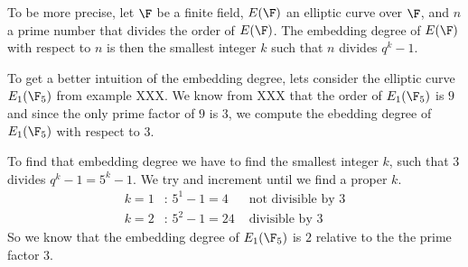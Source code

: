 To be more precise, let $\F$ be a finite field, $E(\F)$ an elliptic curve over $\F$, and $n$ a prime number that divides the order of $E(\F)$. The embedding degree of $E(\F)$ with respect to $n$ is then the smallest integer $k$ such that $n$ divides $q^k-1$.
\begin{example} To get a better intuition of the embedding degree, lets consider the elliptic curve $E_1(\F_5)$ from example XXX. We know from XXX that the order of $E_1(\F_5)$ is $9$ and since the only prime factor of $9$ is $3$, we compute the ebedding degree of $E_1(\F_5)$ with respect to $3$. 

To find that embedding degree we have to find the smallest integer $k$, such that $3$ divides $q^k-1= 5^k-1$. We try and increment until we find a proper $k$. 
\begin{align*}
k=1 &\text{: } 5^1-1 = 4 & \text{ not divisible by } 3\\ 
k=2 &\text{: } 5^2-1 = 24 & \text{ divisible by } 3
\end{align*} 
So we know that the embedding degree of $E_1(\F_5)$ is $2$ relative to the the prime factor $3$.
\end{example}
